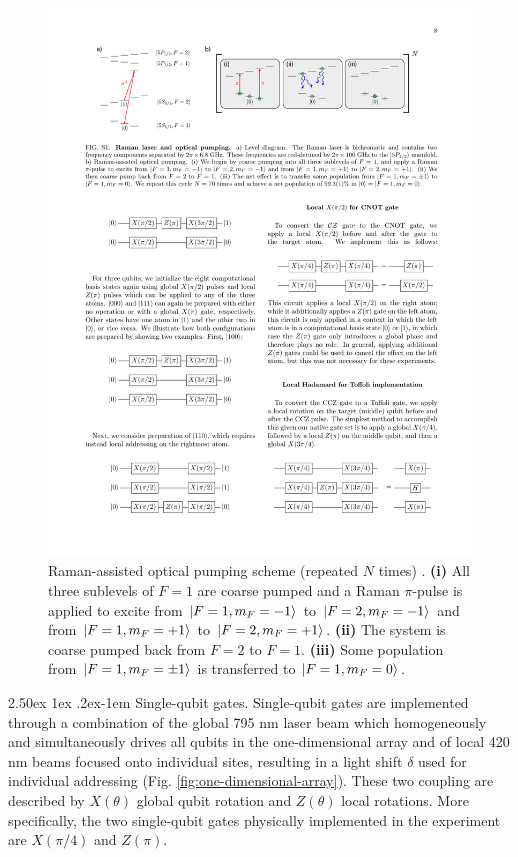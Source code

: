 \documentclass[rmp,10pt,onecolumn,fleqn,notitlepage]{revtex4-1}
\makeatletter
\renewcommand{\paragraph}{%
    \@startsection{paragraph}{4}%
    {\z@}{2.50ex \@plus 1ex \@minus .2ex}{-1em}%
    {\bf\sffamily}%
}
\makeatother
\begin{document}
\begin{figure}[H]
\begin{minipage}{0.45\linewidth}
     \includegraphics[width=1\textwidth]{image/physical_implementation/raman-optical-pumping.pdf}
    \caption{ Raman-assisted optical pumping scheme (repeated $N$ times) \cite{PhysRevLett.123.170503}. \textbf{(i)} All three sublevels of $F=1$ are coarse pumped and a Raman $\pi$-pulse is applied to excite from $\left\vert{F=1,m_F=-1}\right\rangle$ to $\left\vert{F=2,m_F=-1}\right\rangle$ and from $\left\vert{F=1,m_F=+1}\right\rangle$ to $\left\vert{F=2,m_F=+1}\right\rangle$. \textbf{(ii)} The system is coarse pumped back from $F=2$ to $F=1$. \textbf{(iii)} Some population from $\left\vert{F=1,m_F=\pm 1}\right\rangle$ is transferred to $\left\vert{F=1,m_F=0}\right\rangle$.  }
    \label{fig:raman-optical-pumping}
    \end{minipage}
\end{figure}

\paragraph{Single-qubit gates.} Single-qubit gates are implemented through a combination of the global 795 nm laser beam which homogeneously and simultaneously drives all qubits in the one-dimensional array and of local 420 nm beams focused onto individual sites, resulting in a light shift $\delta$ used for individual addressing (Fig. \ref{fig:one-dimensional-array}). These two coupling are described by $X(\theta)$ global qubit rotation and $Z(\theta)$ local rotations. More specifically, the two single-qubit gates physically implemented in the experiment are $X(\pi/4)$ and $Z(\pi)$.
	
\end{document}
